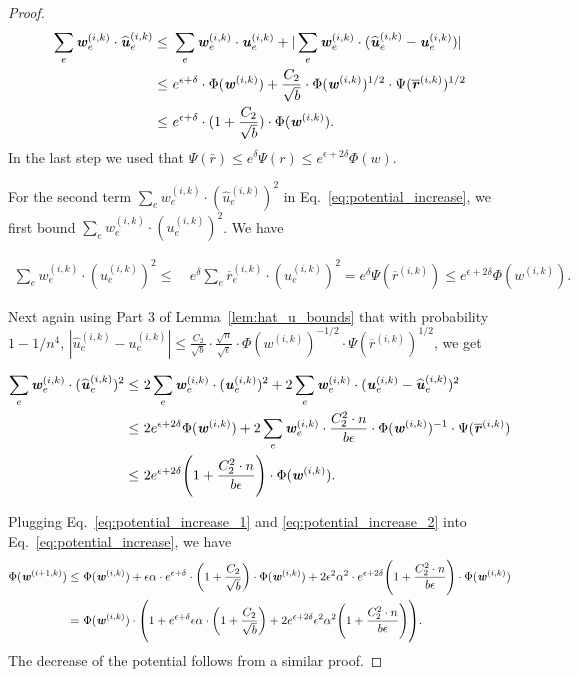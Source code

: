 \documentclass[11pt]{article}
\let\originalleft\left
\let\originalright\right
\renewcommand{\left}{\mathopen{}\mathclose\bgroup\originalleft}
\renewcommand{\right}{\aftergroup\egroup\originalright}
\newcommand\rr{\boldsymbol{\mathit{r}}}
\newcommand\uu{\boldsymbol{\mathit{u}}}
\newcommand\ww{\boldsymbol{\mathit{w}}}
\newcommand\rrbar{\overline{\boldsymbol{\mathit{r}}}}
\newcommand{\wh}{\widehat}
\begin{document}
\begin{proof}
\begin{align}\label{eq:potential_increase_1}
\sum_e \ww_e^{(i,k)} \cdot \wh{\uu}_e^{(i,k)} \leq &~ \sum_e \ww_e^{(i,k)} \cdot \uu_e^{(i,k)} + |\sum_e \ww_e^{(i,k)} \cdot (\wh{\uu}_e^{(i,k)} - \uu_e^{(i,k)})| \notag \\
\leq &~ e^{\epsilon +\delta} \cdot \Phi(\ww^{(i,k)}) + \frac{C_2}{\sqrt{b}} \cdot \Phi(\ww^{(i,k)})^{1/2} \cdot \Psi(\rrbar^{(i,k)})^{1/2} \notag \\
\leq &~ e^{\epsilon +\delta} \cdot (1 + \frac{C_2}{\sqrt{b}}) \cdot \Phi(\ww^{(i,k)}).
\end{align}
In the last step we used that $\Psi(\bar{\rr})\leq e^{\delta}\Psi(\rr) \leq e^{\epsilon+2\delta}\Phi(\ww).$

For the second term $\sum_{e} \ww^{(i,k)}_e \cdot (\wh{\uu}^{(i,k)}_e)^2$ in Eq.~\eqref{eq:potential_increase}, we first bound $\sum_{e} \ww^{(i,k)}_e \cdot (\uu^{(i,k)}_e)^2$. We have

\begin{align*}
\sum_{e} \ww^{(i,k)}_e \cdot (\uu^{(i,k)}_e)^2 \leq &~ e^{\delta}\sum_{e} \rrbar^{(i,k)}_e \cdot (\uu^{(i,k)}_e)^2 
= e^{\delta}\Psi(\rrbar^{(i,k)}) \leq e^{\epsilon + 2\delta} \Phi(\ww^{(i,k)}).
\end{align*}

Next again using Part 3 of Lemma~\ref{lem:hat_u_bounds} that with probability $1-1/n^4$, $|\wh{\uu}^{(i,k)}_e - \uu^{(i,k)}_e| \leq \frac{C_2}{\sqrt{b}} \cdot \frac{\sqrt{n}}{\sqrt{\epsilon}} \cdot \Phi(\ww^{(i,k)})^{-1/2} \cdot \Psi(\rrbar^{(i,k)})^{1/2}$, we get

\begin{align}\label{eq:potential_increase_2}
\sum_{e} \ww^{(i,k)}_e \cdot (\wh{\uu}^{(i,k)}_e)^2 \leq &~ 2 \sum_{e} \ww^{(i,k)}_e \cdot (\uu^{(i,k)}_e)^2 + 2 \sum_{e} \ww^{(i,k)}_e \cdot (\uu^{(i,k)}_e - \wh{\uu}^{(i,k)}_e)^2 \notag \\
\leq &~ 2 e^{\epsilon+2\delta} \Phi(\ww^{(i,k)}) + 2 \sum_{e} \ww^{(i,k)}_e \cdot \frac{C_2^2 \cdot n}{b \epsilon} \cdot \Phi(\ww^{(i,k)})^{-1} \cdot \Psi(\rrbar^{(i,k)}) \notag \\
\leq &~ 2 e^{\epsilon+2\delta} \left(1 + \frac{C_2^2 \cdot n}{b \epsilon}\right) \cdot \Phi(\ww^{(i,k)}).
\end{align}

Plugging Eq.~\eqref{eq:potential_increase_1} and \eqref{eq:potential_increase_2} into Eq.~\eqref{eq:potential_increase}, we have
\begin{align*}
\Phi(\ww^{(i+1,k)}) \leq &~ \Phi(\ww^{(i,k)}) + \epsilon \alpha \cdot e^{\epsilon+\delta} \cdot \left(1 + \frac{C_2}{\sqrt{b}}\right) \cdot \Phi(\ww^{(i,k)}) + 2\epsilon^2 \alpha^2 \cdot e^{\epsilon+2\delta} \left(1 + \frac{C_2^2 \cdot n}{b \epsilon}\right) \cdot \Phi(\ww^{(i,k)}) \\
= &~ \Phi(\ww^{(i,k)}) \cdot \left( 1 + e^{\epsilon+\delta}\epsilon \alpha  \cdot \left(1 + \frac{C_2}{\sqrt{b}}\right) + 2e^{\epsilon+2\delta} \epsilon^2 \alpha^2 \left(1 + \frac{C_2^2 \cdot n}{b \epsilon}\right) \right).
\end{align*}
The decrease of the potential follows from a similar proof.


\end{proof}
\end{document}
